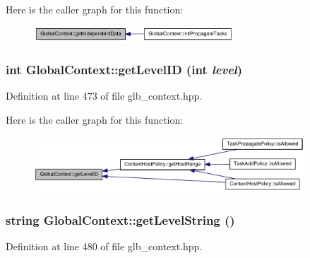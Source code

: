 Here is the caller graph for this function:\nopagebreak
\begin{figure}[H]
\begin{center}
\leavevmode
\includegraphics[width=212pt]{class_global_context_a9cf2bd9142e7592455d0542ee457f6ff_icgraph}
\end{center}
\end{figure}
\hypertarget{class_global_context_a6e83bae803b2a595b2679b6b34bd572f}{
\subsubsection[{getLevelID}]{\setlength{\rightskip}{0pt plus 5cm}int GlobalContext::getLevelID (int {\em level})}}
\label{class_global_context_a6e83bae803b2a595b2679b6b34bd572f}


Definition at line 473 of file glb\_\-context.hpp.

Here is the caller graph for this function:\nopagebreak
\begin{figure}[H]
\begin{center}
\leavevmode
\includegraphics[width=287pt]{class_global_context_a6e83bae803b2a595b2679b6b34bd572f_icgraph}
\end{center}
\end{figure}
\hypertarget{class_global_context_a3f1200ddc2119935fac3b8b4ef5143d1}{
\subsubsection[{getLevelString}]{\setlength{\rightskip}{0pt plus 5cm}string GlobalContext::getLevelString ()}}
\label{class_global_context_a3f1200ddc2119935fac3b8b4ef5143d1}


Definition at line 480 of file glb\_\-context.hpp.

